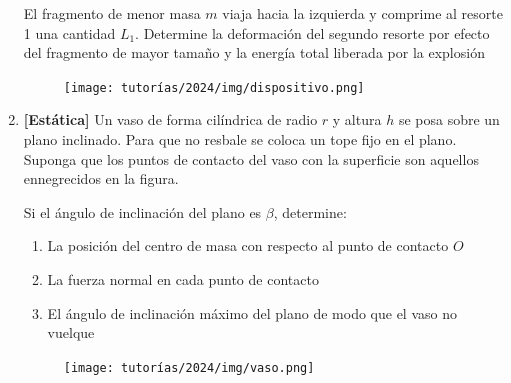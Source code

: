 \documentclass[letterpaper,11pt]{article}
\begin{document}
\begin{enumerate}
El fragmento de menor masa $m$ viaja hacia la izquierda y comprime al resorte 1 una cantidad $L_1$. Determine la deformación del segundo resorte por efecto del fragmento de mayor tamaño y la energía total liberada por la explosión

\begin{figure}[H]
    \centering
    \texttt{[image: tutorías/2024/img/dispositivo.png]}
\end{figure}

\item \textbf{[Estática]} Un vaso de forma cilíndrica de radio $r$ y altura $h$ se posa sobre un plano inclinado. Para que no resbale se coloca un tope fijo en el plano. Suponga que los puntos de contacto del vaso con la superficie son aquellos ennegrecidos en la figura.

\begin{minipage}{0.6\linewidth}
    Si el ángulo de inclinación del plano es $\beta$, determine:
    \begin{enumerate}
        \item La posición del centro de masa con respecto al punto de contacto $O$
    
        \item La fuerza normal en cada punto de contacto
    
        \item El ángulo de inclinación máximo del plano de modo que el vaso no vuelque
    \end{enumerate}
\end{minipage}
\hfill
\begin{minipage}{0.3\linewidth}
    \begin{figure}[H]
        \centering
        \texttt{[image: tutorías/2024/img/vaso.png]}
    \end{figure}    
\end{minipage}
%   

\end{enumerate}
\end{document}
